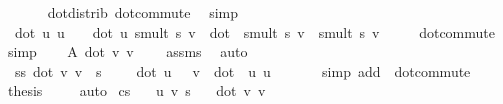 \begin{isabellebody}
\ \ \ \ \isamarkupfalse%
\ {}\ dot{\isacharunderscore}{\kern0pt}distrib\ dot{\isacharunderscore}{\kern0pt}commute\ \isamarkupfalse%
\ simp\isanewline
\ \ \isamarkupfalse%
\ {}{\isacharcolon}{\kern0pt}\ {\isachardoublequoteopen}dot\ u\ u\ {\isacharplus}{\kern0pt}\ {}\ {\isacharasterisk}{\kern0pt}\ {\isacharparenleft}{\kern0pt}dot\ u\ {\isacharparenleft}{\kern0pt}smult\ s\ v{\isacharparenright}{\kern0pt}{\isacharparenright}{\kern0pt}\ {\isacharplus}{\kern0pt}\ dot\ \ {\isacharparenleft}{\kern0pt}smult\ s\ v{\isacharparenright}{\kern0pt}\ \ {\isacharparenleft}{\kern0pt}smult\ s\ v{\isacharparenright}{\kern0pt}\ {\isasymge}\ {}{\isachardoublequoteclose}\ \isamarkupfalse%
\ {}\ dot{\isacharunderscore}{\kern0pt}commute\ \isamarkupfalse%
\ simp\isanewline
\ \ \isamarkupfalse%
\ A{}{\isacharcolon}{\kern0pt}\ {\isachardoublequoteopen}dot\ v\ v\ {\isasymnoteq}\ {}{\isachardoublequoteclose}\ \isamarkupfalse%
\ assms\ \isamarkupfalse%
\ auto\isanewline
\ \ \isamarkupfalse%
\ {}{\isacharcolon}{\kern0pt}\ {\isachardoublequoteopen}s{\isacharasterisk}{\kern0pt}s{\isacharasterisk}{\kern0pt}\ dot\ v\ v\ {\isacharplus}{\kern0pt}\ s\ {\isacharasterisk}{\kern0pt}\ {}\ {\isacharasterisk}{\kern0pt}\ \ {\isacharparenleft}{\kern0pt}dot\ u\ \ \ v{\isacharparenright}{\kern0pt}\ {\isacharplus}{\kern0pt}\ {\isacharparenleft}{\kern0pt}dot\ \ u\ u{\isacharparenright}{\kern0pt}\ {\isasymge}\ {}{\isachardoublequoteclose}\ \isamarkupfalse%
\ {}\ \isamarkupfalse%
\ {\isacharparenleft}{\kern0pt}simp\ add{\isacharcolon}{\kern0pt}\ \ dot{\isacharunderscore}{\kern0pt}commute{\isacharparenright}{\kern0pt}\isanewline
\ \ \isamarkupfalse%
\ \isamarkupfalse%
\ {\isacharquery}{\kern0pt}thesis\ \isamarkupfalse%
\ {}\ \isamarkupfalse%
\ auto\isanewline
{}\isamarkupfalse%
%
\endisatagproof
{\isafoldproof}%
%
\isadelimproof
\isanewline
%
\endisadelimproof
\isanewline
{}\isamarkupfalse%
\ cs{}{\isacharcolon}{\kern0pt}\isanewline
\ \ \ u\ v\ s\isanewline
\ \ \ {\isachardoublequoteopen}{\isacharparenleft}{\kern0pt}dot\ v\ v{\isacharparenright}{\kern0pt}\ \ {\isasymnoteq}\ {}{\isachardoublequoteclose}\isanewline

\end{isabellebody}
